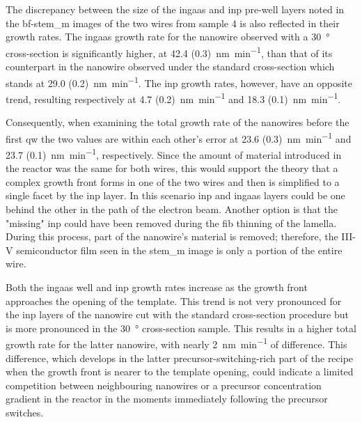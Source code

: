 The discrepancy between the size of the \acs{ingaas} and \acs{inp} pre-well layers noted in the \acs{bf}-\acs{stem_m} images of the two wires from sample 4 is also reflected in their growth rates. The \acs{ingaas} growth rate for the nanowire observed with a \qty{30}{\degree} cross-section is significantly higher, at \qty[separate-uncertainty=true]{42.4 (0.3)}{\nano\metre\per\minute}, than that of its counterpart in the nanowire observed under the standard cross-section which stands at \qty[separate-uncertainty=true]{29.0 (0.2)}{\nano\metre\per\minute}. The \acs{inp} growth rates, however, have an opposite trend, resulting respectively at \qty[separate-uncertainty=true]{4.7 (0.2)}{\nano\metre\per\minute} and \qty[separate-uncertainty=true]{18.3 (0.1)}{\nano\metre\per\minute}. 

Consequently, when examining the total growth rate of the nanowires before the first \acl{qw} the two values are within each other's error at \qty[separate-uncertainty=true]{23.6 (0.3)}{\nano\metre\per\minute} and \qty[separate-uncertainty=true]{23.7 (0.1)}{\nano\metre\per\minute}, respectively. Since the amount of material introduced in the reactor was the same for both wires, this would support the theory that a complex growth front forms in one of the two wires and then is simplified to a single  facet by the \acs{inp} layer. In this scenario \acs{inp} and \acs{ingaas} layers could be one behind the other in the path of the electron beam. Another option is that the "missing" \acs{inp} could have been removed during the \acs{fib} thinning of the lamella. During this process, part of the nanowire's material is removed; therefore, the III-V semiconductor film seen in the \acs{stem_m} image is only a portion of the entire wire.

Both the \acs{ingaas} well and \acs{inp} growth rates increase as the growth front approaches the opening of the template. This trend is not very pronounced for the \acs{inp} layers of the nanowire cut with the standard cross-section procedure but is more pronounced in the \qty{30}{\degree} cross-section sample. This results in a higher total growth rate for the latter nanowire, with nearly \qty{2}{\nano\metre\per\minute} of difference. This difference, which develops in the latter precursor-switching-rich part of the recipe when the growth front is nearer to the template opening, could indicate a limited competition between neighbouring nanowires or a precursor concentration gradient in the reactor in the moments immediately following the precursor switches.
\par

